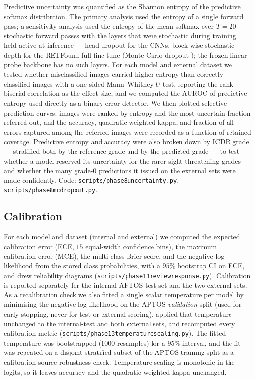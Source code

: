 \documentclass[journal]{IEEEtran}
\renewcommand{\_}{\origunderscore\allowbreak}
\begin{document}
Predictive uncertainty was quantified as the Shannon entropy of the predictive
softmax distribution. The primary analysis used the entropy of a single forward
pass; a sensitivity analysis used the entropy of the mean softmax over $T=20$
stochastic forward passes with the layers that were stochastic during training
held active at inference --- head dropout for the CNNs, block-wise stochastic
depth for the RETFound full fine-tune (Monte-Carlo dropout
\cite{gal2016dropout}); the frozen linear-probe backbone has no such layers. For
each model and external dataset we tested whether misclassified images carried
higher entropy than correctly classified images with a one-sided Mann--Whitney
$U$ test, reporting the rank-biserial correlation as the effect size, and we
computed the AUROC of predictive entropy used directly as a binary error
detector. We then plotted selective-prediction curves: images were ranked by
entropy and the most uncertain fraction referred out, and the accuracy,
quadratic-weighted kappa, and fraction of all errors captured among the referred
images were recorded as a function of retained coverage. Predictive entropy and
accuracy were also broken down by ICDR grade --- stratified both by the reference
grade and by the predicted grade --- to test whether a model reserved its
uncertainty for the rarer sight-threatening grades and whether the many grade-0
predictions it issued on the external sets were made confidently. Code:
\texttt{scripts/\allowbreak{}phase8\_uncertainty.py}, \texttt{scripts/\allowbreak{}phase8\_mc\_dropout.py}.

\subsection{Calibration}
\label{sec:methods-calib}

For each model and dataset (internal and external) we computed the expected
calibration error (ECE, $15$ equal-width confidence bins), the maximum
calibration error (MCE), the multi-class Brier score, and the negative
log-likelihood from the stored class probabilities, with a $95\%$ bootstrap CI on
ECE, and drew reliability diagrams
(\texttt{scripts/\allowbreak{}phase11\_review\_response.py}). Calibration is reported
separately for the internal APTOS test set and the two external sets. As a
recalibration check we also fitted a single scalar temperature per model by
minimising the negative log-likelihood on the APTOS \emph{validation} split
(used for early stopping, never for test or external scoring), applied that
temperature unchanged to the internal-test and both external sets, and recomputed
every calibration metric (\texttt{scripts/\allowbreak{}phase13\_temperature\_scaling.py}). The
fitted temperature was bootstrapped ($1000$ resamples) for a $95\%$ interval, and
the fit was repeated on a disjoint stratified subset of the APTOS training split
as a calibration-source robustness check. Temperature scaling is monotonic in the
logits, so it leaves accuracy and the quadratic-weighted kappa unchanged.
\end{document}
